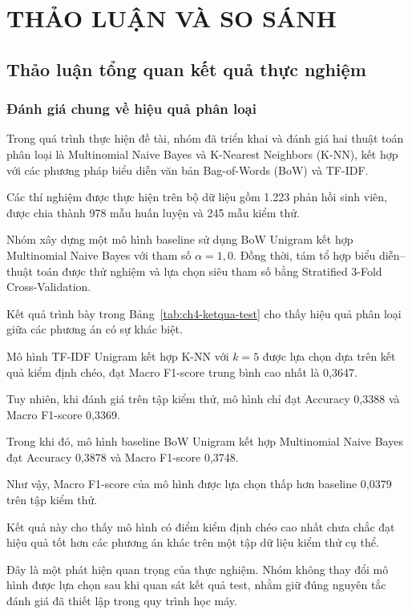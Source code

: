 
\chapter{THẢO LUẬN VÀ SO SÁNH}


\section{Thảo luận tổng quan kết quả thực nghiệm}

\subsection{Đánh giá chung về hiệu quả phân loại}

Trong quá trình thực hiện đề tài, nhóm đã triển khai
và đánh giá hai thuật toán phân loại là Multinomial
Naive Bayes và K-Nearest Neighbors (K-NN), kết hợp
với các phương pháp biểu diễn văn bản Bag-of-Words
(BoW) và TF-IDF.

Các thí nghiệm được thực hiện trên bộ dữ liệu gồm
1.223 phản hồi sinh viên, được chia thành 978 mẫu
huấn luyện và 245 mẫu kiểm thử.

Nhóm xây dựng một mô hình baseline sử dụng
BoW Unigram kết hợp Multinomial Naive Bayes với
tham số $\alpha=1,0$. Đồng thời, tám tổ hợp
biểu diễn--thuật toán được thử nghiệm và lựa chọn
siêu tham số bằng Stratified 3-Fold Cross-Validation.

Kết quả trình bày trong
Bảng~\ref{tab:ch4-ketqua-test}
cho thấy hiệu quả phân loại giữa các phương án
có sự khác biệt.

Mô hình TF-IDF Unigram kết hợp K-NN với $k=5$
được lựa chọn dựa trên kết quả kiểm định chéo,
đạt Macro F1-score trung bình cao nhất là 0,3647.

Tuy nhiên, khi đánh giá trên tập kiểm thử,
mô hình chỉ đạt Accuracy 0,3388 và Macro
F1-score 0,3369.

Trong khi đó, mô hình baseline BoW Unigram
kết hợp Multinomial Naive Bayes đạt Accuracy
0,3878 và Macro F1-score 0,3748.

Như vậy, Macro F1-score của mô hình được lựa chọn
thấp hơn baseline 0,0379 trên tập kiểm thử.

Kết quả này cho thấy mô hình có điểm kiểm định chéo
cao nhất chưa chắc đạt hiệu quả tốt hơn các phương
án khác trên một tập dữ liệu kiểm thử cụ thể.

Đây là một phát hiện quan trọng của thực nghiệm.
Nhóm không thay đổi mô hình được lựa chọn sau khi
quan sát kết quả test, nhằm giữ đúng nguyên tắc
đánh giá đã thiết lập trong quy trình học máy.


